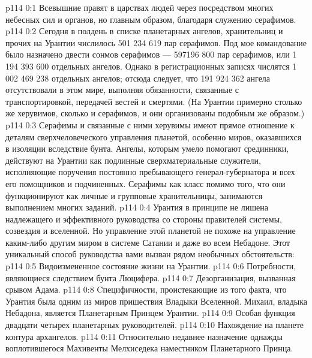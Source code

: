 \vs p114 0:1 Всевышние правят в царствах людей через посредством многих небесных сил и органов, но главным образом, благодаря служению серафимов.
\vs p114 0:2 Сегодня в полдень в списке планетарных ангелов, хранительниц и прочих на Урантии числилось 501 234 619 пар серафимов. Под мое командование было назначено двести сонмов серафимов --- 597196 800 пар серафимов, или 1 194 393 600 отдельных ангелов. Однако в регистрационных записях числятся 1 002 469 238 отдельных ангелов; отсюда следует, что 191 924 362 ангела отсутствовали в этом мире, выполняя обязанности, связанные с транспортировкой, передачей вестей и смертями. (На Урантии примерно столько же херувимов, сколько и серафимов, и они организованы подобным же образом.)
\vs p114 0:3 Серафимы и связанные с ними херувимы имеют прямое отношение к деталям сверхчеловеческого управления планетой, особенно миров, оказавшихся в изоляции вследствие бунта. Ангелы, которым умело помогают срединники, действуют на Урантии как подлинные сверхматериальные служители, исполняющие поручения постоянно пребывающего генерал\hyp{}губернатора и всех его помощников и подчиненных. Серафимы как класс помимо того, что они функционируют как личные и групповые хранительницы, занимаются выполнением многих заданий.
\vs p114 0:4 Урантия в принципе не лишена надлежащего и эффективного руководства со стороны правителей системы, созвездия и вселенной. Но управление этой планетой не похоже на управление каким\hyp{}либо другим миром в системе Сатании и даже во всем Небадоне. Этот уникальный способ руководства вами вызван рядом необычных обстоятельств:
\vs p114 0:5 \bibnobreakspace Видоизмененное состояние жизни на Урантии.
\vs p114 0:6 \bibnobreakspace Потребности, являющиеся следствием бунта Люцифера.
\vs p114 0:7 \bibnobreakspace Дезорганизация, вызванная срывом Адама.
\vs p114 0:8 \bibnobreakspace Cпецифичности, проистекающие из того факта, что Урантия была одним из миров пришествия Владыки Вселенной. Михаил, владыка Небадона, является Планетарным Принцем Урантии.
\vs p114 0:9 \bibnobreakspace Особая функция двадцати четырех планетарных руководителей.
\vs p114 0:10 \bibnobreakspace Нахождение на планете контура архангелов.
\vs p114 0:11 \bibnobreakspace Относительно недавнее назначение однажды воплотившегося Махивенты Мелхиседека наместником Планетарного Принца.

